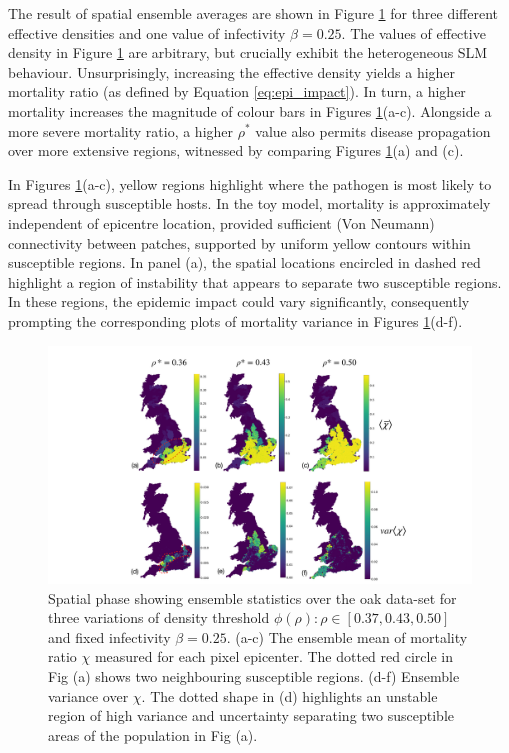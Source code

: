 The result of spatial ensemble averages are shown in Figure \ref{fig:oak-spatial-ensemble}
for three different effective densities and one value of infectivity $\beta=0.25$. 
The values of effective density in Figure \ref{fig:oak-spatial-ensemble} are arbitrary,
but crucially exhibit the heterogeneous SLM behaviour. Unsurprisingly, increasing the effective density yields a 
higher mortality ratio (as defined by Equation \ref{eq:epi_impact}).
In turn, a higher mortality increases the magnitude of colour bars in Figures \ref{fig:oak-spatial-ensemble}(a-c). Alongside a more severe mortality ratio, a higher $\rho^*$
value also permits disease propagation over more extensive regions, witnessed by comparing Figures \ref{fig:oak-spatial-ensemble}(a) and (c).

In Figures \ref{fig:oak-spatial-ensemble}(a-c), yellow regions highlight where the pathogen is most 
likely to spread through susceptible hosts. In the toy model, mortality is approximately independent of epicentre location, 
provided sufficient (Von Neumann) connectivity between patches, supported by uniform yellow contours within susceptible regions.
In panel (a), the spatial locations encircled in dashed red highlight a region of instability that appears to separate two susceptible regions.
In these regions, the epidemic impact could vary significantly, 
consequently prompting the corresponding plots of mortality variance in Figures \ref{fig:oak-spatial-ensemble}(d-f).

\begin{figure}
    \centering
    \includegraphics[scale=0.4]{chapter4/figures/figure5.pdf}
    \caption{Spatial phase showing ensemble statistics over the oak data-set for three variations of density threshold $\phi(\rho): \rho \in [0.37, 0.43, 0.50]$ and fixed infectivity $\beta=0.25$. (a-c) The ensemble mean of mortality ratio $\chi$ measured for each pixel epicenter. The dotted red circle in Fig (a) shows two neighbouring susceptible regions. (d-f) Ensemble variance over $\chi$. The dotted shape in (d) highlights an unstable region of high variance and uncertainty separating two susceptible areas of the population in Fig (a).}
    \label{fig:oak-spatial-ensemble}
\end{figure}

